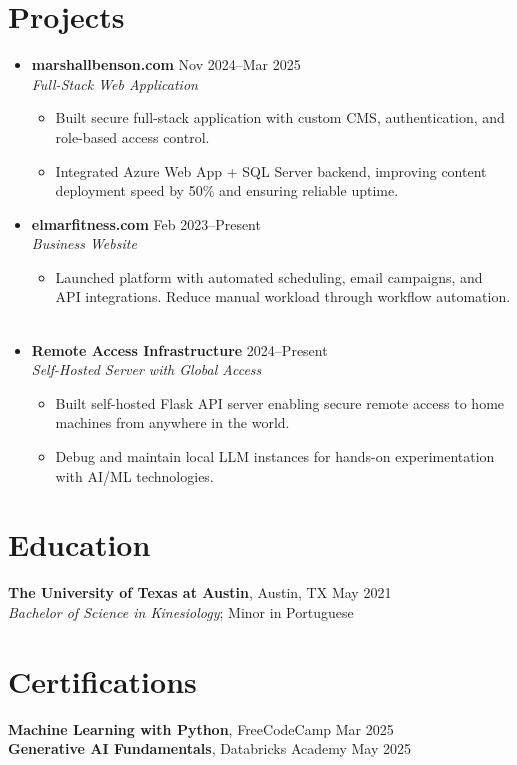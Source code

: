 \documentclass[letterpaper,10pt]{article}
\newcommand{\resumeItem}[1]{\item \small{#1}}
\begin{document}
\section*{Projects}
\begin{itemize}
  \item[]
    \textbf{marshallbenson.com} \hfill Nov 2024--Mar 2025 \\
    \textit{Full-Stack Web Application}
  \begin{itemize}
    \resumeItem{Built secure full-stack application with custom CMS, authentication, and role-based access control.}
    \resumeItem{Integrated Azure Web App + SQL Server backend, improving content deployment speed by 50\% and ensuring reliable uptime.}
  \end{itemize}

  \item[]
    \textbf{elmarfitness.com} \hfill Feb 2023--Present \\
    \textit{Business Website}
  \begin{itemize}
    \resumeItem{Launched platform with automated scheduling, email campaigns, and API integrations. Reduce manual workload through workflow automation.}
    \
  \end{itemize}

  \item[]
    \textbf{Remote Access Infrastructure} \hfill 2024--Present \\
    \textit{Self-Hosted Server with Global Access}
  \begin{itemize}
    \resumeItem{Built self-hosted Flask API server enabling secure remote access to home machines from anywhere in the world.}
    \resumeItem{Debug and maintain local LLM instances for hands-on experimentation with AI/ML technologies.}
  \end{itemize}
\end{itemize}

\section*{Education}
\textbf{The University of Texas at Austin}, Austin, TX \hfill May 2021 \\
\textit{Bachelor of Science in Kinesiology}; Minor in Portuguese

\section*{Certifications}
\textbf{Machine Learning with Python}, FreeCodeCamp \hfill Mar 2025 \\
\textbf{Generative AI Fundamentals}, Databricks Academy \hfill May 2025
\end{document}
